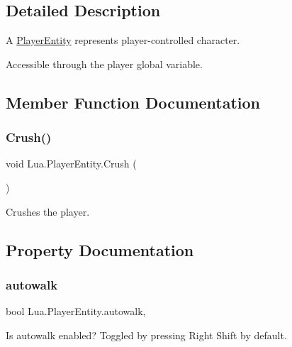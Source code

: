 \subsection{Detailed Description}
A \mbox{\hyperlink{class_lua_1_1_player_entity}{Player\+Entity}} represents player-\/controlled character. 

Accessible through the {\ttfamily player} global variable. 

\subsection{Member Function Documentation}
\mbox{\label{class_lua_1_1_player_entity_a9d1469da41be5408b4d6702dc04f3351}} 
\subsubsection{\texorpdfstring{Crush()}{Crush()}}
{\footnotesize\ttfamily void Lua.\+Player\+Entity.\+Crush (\begin{DoxyParamCaption}{ }\end{DoxyParamCaption})}



Crushes the player. 



\subsection{Property Documentation}
\mbox{\label{class_lua_1_1_player_entity_a1137d463c4ca74abf6fcb032e5311755}} 
\subsubsection{\texorpdfstring{autowalk}{autowalk}}
{\footnotesize\ttfamily bool Lua.\+Player\+Entity.\+autowalk\hspace{0.3cm}{\ttfamily [get]}, {\ttfamily [set]}}



Is autowalk enabled? Toggled by pressing {\ttfamily Right Shift} by default. 

\mbox{\label{class_lua_1_1_player_entity_ae050a6ac5d73748b2e989b3b3fbfd61d}} 
